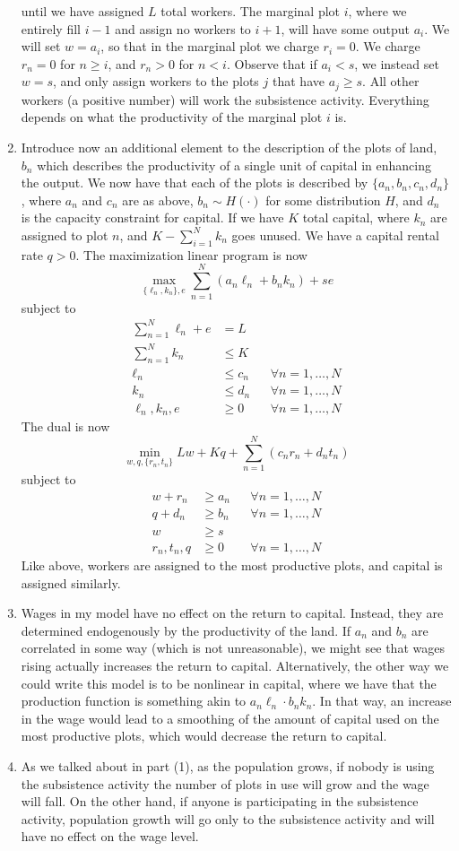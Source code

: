\documentclass[10pt]{article}
\begin{document}
\begin{enumerate}
until we have assigned $L$ total workers. The marginal plot $i$, where we entirely fill $i-1$ and assign no workers to $i+1$, will have some output $a_i$. We will set $w = a_i$, so that in the marginal plot we charge $r_i = 0$. We charge $r_n = 0$ for $n \ge i$, and $r_n > 0$ for $n < i$. Observe that if $a_i < s$, we instead set $w = s$, and only assign workers to the plots $j$ that have $a_j \ge s$. All other workers (a positive number) will work the subsistence activity. Everything depends on what the productivity of the marginal plot $i$ is.
	\item Introduce now an additional element to the description of the plots of land, $b_n$ which describes the productivity of a single unit of capital in enhancing the output. We now have that each of the plots is described by $\{a_n,b_n,c_n,d_n\}$, where $a_n$ and $c_n$ are as above, $b_n \sim H(\cdot)$ for some distribution $H$, and $d_n$ is the capacity constraint for capital. If we have $K$ total capital, where $k_n$ are assigned to plot $n$, and $K - \sum_{i=1}^N k_n$ goes unused. We have a capital rental rate $q > 0$. The maximization linear program is now \[\max_{\{\ell_n,k_n\},e} \sum_{n=1}^N (a_n \ell_n + b_nk_n) + se\]subject to \begin{align*} \sum_{n=1}^N \ell_n + e &= L \\ \sum_{n=1}^N k_n &\le K \\ \ell_n &\le c_n &&\forall n=1,\dots,N \\ k_n &\le d_n &&\forall n=1,\dots,N \\ \ell_n,k_n,e &\ge 0 &&\forall n = 1,\dots,N\end{align*}The dual is now \[\min_{w,q,\{r_n,t_n\}} Lw + Kq + \sum_{n=1}^N (c_nr_n + d_nt_n)\]subject to\begin{align*} w + r_n &\ge a_n &&\forall n = 1,\dots,N \\ q + d_n &\ge b_n &&\forall n = 1,\dots,N \\w &\ge s \\r_n,t_n,q &\ge 0 &&\forall n = 1,\dots,N\end{align*} Like above, workers are assigned to the most productive plots, and capital is assigned similarly. 
	\item Wages in my model have no effect on the return to capital. Instead, they are determined endogenously by the productivity of the land. If $a_n$ and $b_n$ are correlated in some way (which is not unreasonable), we might see that wages rising actually increases the return to capital. Alternatively, the other way we could write this model is to be nonlinear in capital, where we have that the production function is something akin to $a_n\ell_n \cdot b_nk_n$. In that way, an increase in the wage would lead to a smoothing of the amount of capital used on the most productive plots, which would decrease the return to capital. 
	\item As we talked about in part (1), as the population grows, if nobody is using the subsistence activity the number of plots in use will grow and the wage will fall. On the other hand, if anyone is participating in the subsistence activity, population growth will go only to the subsistence activity and will have no effect on the wage level.
\end{enumerate}
\end{document}
